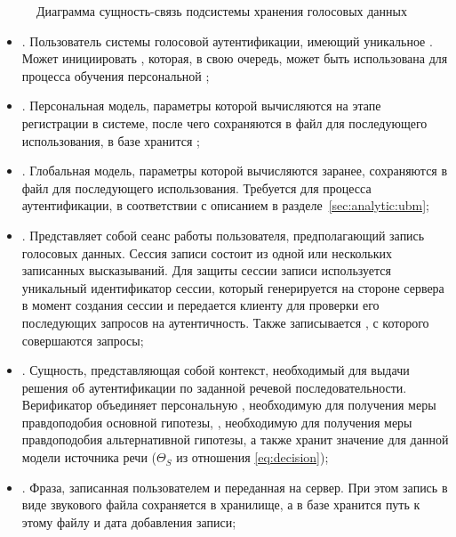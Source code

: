 \begin{figure}[ht]
    \caption{Диаграмма сущность-связь подсистемы хранения голосовых данных}
    \label{fig:er_main}
\end{figure}

\begin{itemize}
\item {}. Пользователь системы голосовой аутентификации, имеющий уникальное . Может инициировать , которая, в свою очередь, может быть использована для процесса обучения персональной ;
\item {}. Персональная модель, параметры которой вычисляются на этапе регистрации в системе, после чего сохраняются в файл для последующего использования, в базе хранится ;
\item {}. Глобальная модель, параметры которой вычисляются заранее, сохраняются в файл для последующего использования. Требуется для процесса аутентификации, в соответствии с описанием в разделе~\ref{sec:analytic:ubm};
\item {}. Представляет собой сеанс работы пользователя, предполагающий запись голосовых данных. Сессия записи состоит из одной или нескольких записанных высказываний. Для защиты сессии записи используется уникальный идентификатор сессии, который генерируется на стороне сервера в момент создания сессии и передается клиенту для проверки его последующих запросов на аутентичность. Также записывается , с которого совершаются запросы;
\item {}. Сущность, представляющая собой контекст, необходимый для выдачи решения об аутентификации по заданной речевой последовательности. Верификатор объединяет персональную , необходимую для получения меры правдоподобия основной гипотезы, , необходимую для получения меры правдоподобия альтернативной гипотезы, а также хранит значение  для данной модели источника речи ($\Theta_S$ из отношения \ref{eq:decision});
\item {}. Фраза, записанная пользователем и переданная на сервер. При этом запись в виде звукового файла сохраняется в хранилище, а в базе хранится путь к этому файлу и дата добавления записи;

\end{itemize}
